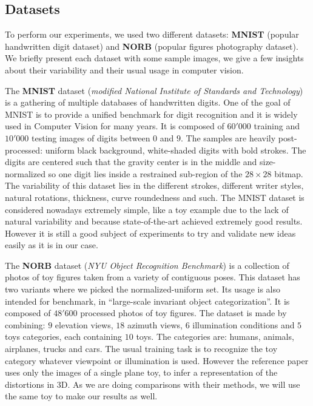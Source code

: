 \documentclass[a4paper,12pt]{report}
\begin{document}
\subsection{Datasets}
To perform our experiments, we used two different datasets: {\bf MNIST}\cite{lecun1998mnist} (popular handwritten digit dataset) and {\bf NORB}\cite{lecun2004learning} (popular figures photography dataset).
We briefly present each dataset with some sample images, we give a few insights about their variability and their usual usage in computer vision.

The {\bf MNIST} dataset ({\em modified National Institute of Standards and Technology}) is a gathering of multiple databases of handwritten digits.
One of the goal of MNIST is to provide a unified benchmark for digit recognition and it is widely used in Computer Vision for many years.
It is composed of $60'000$ training and $10'000$ testing images of digits between $0$ and $9$.
The samples are heavily post-processed: uniform black background, white-shaded digits with bold strokes.
The digits are centered such that the gravity center is in the middle and size-normalized so one digit lies inside a restrained sub-region of the $28 \times 28$ bitmap.
The variability of this dataset lies in the different strokes, different writer styles, natural rotations, thickness, curve roundedness and such.
The MNIST dataset is considered nowadays extremely simple, like a toy example due to the lack of natural variability and because state-of-the-art achieved extremely good results.
However it is still a good subject of experiments to try and validate new ideas easily as it is in our case.

The {\bf NORB} dataset ({\em NYU Object Recognition Benchmark}) is a collection of photos of toy figures taken from a variety of contiguous poses.
This dataset has two variants where we picked the normalized-uniform set.
Its usage is also intended for benchmark, in ``large-scale invariant object categorization''.
It is composed of $48'600$ processed photos of toy figures.
The dataset is made by combining: $9$ elevation views, $18$ azimuth views, $6$ illumination conditions and $5$ toys categories, each containing $10$ toys.
The categories are: humans, animals, airplanes, trucks and cars.
The usual training task is to recognize the toy category whatever viewpoint or illumination is used.
However the reference paper uses only the images of a single plane toy, to infer a representation of the distortions in 3D.
As we are doing comparisons with their methods, we will use the same toy to make our results as well.
\end{document}
